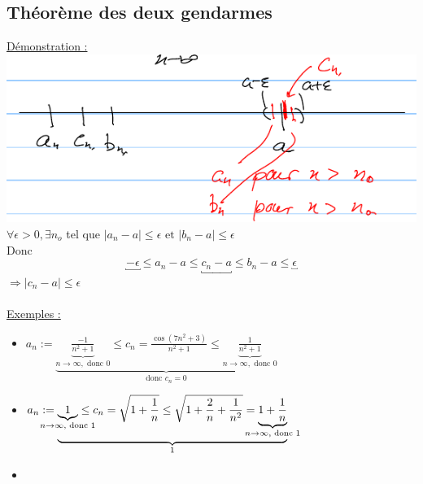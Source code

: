 \documentclass[12pt,a4paper]{article}
\begin{document}
{\subsection{Théorème des deux gendarmes}
\begin{center}
\end{center}
\underline{Démonstration : }\\
\includegraphics[scale=0.5]{illustrations_Analyse/gendarmes}\\
$\forall \epsilon > 0, \exists n_o$ tel que $|a_n-a| \leq \epsilon \text{ et } |b_n -a| \leq \epsilon$\\
Donc 
\begin{equation}
\underbracket{-\epsilon} \leq a_n -a \leq \underbracket{c_n -a} \leq b_n -a \leq \underbracket{\epsilon}
\end{equation}
$\Rightarrow |c_n -a| \leq \epsilon$\\
\\
\underline{Exemples :}\\
\begin{itemize}
\item $a_n := \underbrace{\underbrace{\frac{-1}{n^2 + 1}}_{n \to \infty, \text{ donc } 0} \leq c_n = \frac{\cos(7n^2+3)}{n^2 + 1}  \leq \underbrace{\frac{1}{n^2 + 1}}_{n \to \infty, \text{ donc } 0}}_{\text{donc } c_n = 0}$
\item $a_n := \underbrace{\underbrace{1}_{\mathclap{n \to \infty, \text{ donc } 1}} \leq c_n = \sqrt{1+\frac{1}{n}} \leq \sqrt{1+\frac{2}{n} + \frac{1}{n^2}} = \underbrace{1 + \frac{1}{n}}_{\mathclap{n \to \infty, \text{ donc } 1}}}_{1}$
\item %
\end{itemize}

}
\end{document}
